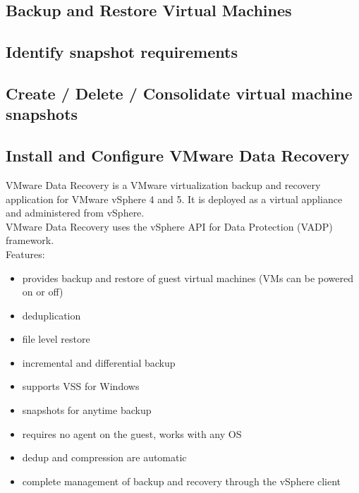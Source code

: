 \subsection{Backup and Restore Virtual Machines}

\subsection{Identify snapshot requirements}

\subsection{Create / Delete / Consolidate virtual machine snapshots}

\subsection{Install and Configure VMware Data Recovery}

VMware Data Recovery is a VMware virtualization backup and recovery application
for VMware vSphere 4 and 5. It is deployed as a virtual appliance and
administered from vSphere.\\

VMware Data Recovery uses the vSphere API for Data Protection (VADP)
framework.\\

Features:

\begin{itemize}

\item provides backup and restore of guest virtual machines (VMs can be
powered on or off)

\item deduplication

\item file level restore

\item incremental and differential backup

\item supports VSS for Windows

\item snapshots for anytime backup

\item requires no agent on the guest, works with any OS

\item dedup and compression are automatic

\item complete management of backup and recovery through the vSphere client

\end{itemize}

